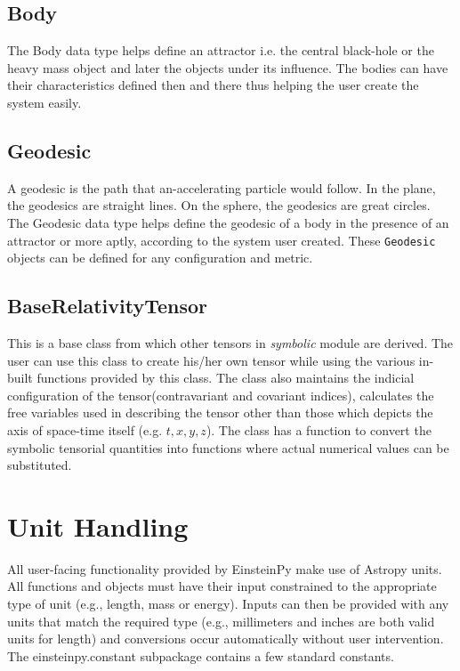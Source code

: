 \documentclass[refree]{aa}
\begin{document}
  \subsection{Body}
  The Body data type helps define an attractor i.e. the central black-hole 
  or the heavy mass object and later the objects under its influence. 
  The bodies can have their characteristics defined then and there thus 
  helping the user create the system easily. 
  
  \subsection{Geodesic}
  A geodesic is the path that an-accelerating particle would follow. 
  In the plane, the geodesics are straight lines. On the sphere, the 
  geodesics are great circles. The Geodesic data type helps define the 
  geodesic of a body in the presence of an attractor or more aptly, 
  according to the system user created. These \texttt{Geodesic} objects 
  can be defined for any configuration and metric. 
  
  \subsection{BaseRelativityTensor}
  This is a base class from which other tensors in \textit{symbolic} 
  module are derived. The user can use this class to create his/her 
  own tensor while using the various in-built functions provided by this 
  class. The class also maintains the indicial configuration of 
  the tensor(contravariant and covariant indices), calculates the 
  free variables used in describing the tensor other than those which 
  depicts the axis of space-time itself (e.g. $t, x, y, z$). The class 
  has a function to convert the symbolic tensorial quantities into 
  functions where actual numerical values can be substituted.

\section{Unit Handling}

All user-facing functionality provided by EinsteinPy make use of Astropy \citet{astropy:2013} units. All functions and objects must have their input 
constrained to the appropriate type of unit (e.g., length, mass or energy). 
Inputs can then be provided with any units that match the required type 
(e.g., millimeters and inches are both valid units for length) and conversions 
occur automatically without user intervention. The einsteinpy.constant 
subpackage contains a few standard constants.
\end{document}
